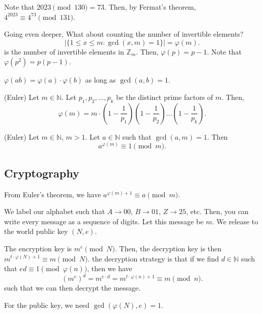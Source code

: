 \documentclass[a4paper]{article}
\begin{document}
Note that \( 2023 \pmod {130} = 73 \). Then, by Fermat's theorem, \( 4^{2023} \equiv 4^{73} \pmod {131}   \).

Going even deeper, What about counting the number of invertible elements?
\[
	\left| \{1 \le  x \le m \colon \gcd(x,m)=1\}   \right| = \varphi(m)
.\] is the number of invertible elements in \( \mathbb{Z}_m \). Then, \( \varphi(p)=p-1 \). Note that \( \varphi(p^2)=p(p-1) \).

\begin{theorem}
	\( \varphi(ab)=\varphi(a) \cdot  \varphi(b) \) as long as \( \gcd(a,b)=1 \).
\end{theorem}

\begin{theorem}
	(Euler) Let \( m \in \mathbb{N} \). Let \( p_{1},p_{2},\ldots ,p_k \) be the distinct prime factors of \( m \). Then, \[
		\varphi(m) = m \cdot \left( 1-\frac{1}{p_{1}} \right) \left( 1- \frac{1}{p_{2}} \right)\ldots  \left( 1-\frac{1}{p_k} \right) 
	.\] 
\end{theorem}

\begin{theorem}
	(Euler) Let \( m \in \mathbb{N} \), \( m > 1 \). Let \( a \in \mathbb{N} \) such that \( \gcd(a,m)=1 \). Then \[
		a^{\varphi(m)} \equiv 1 \pmod m
	.\] 
\end{theorem}

\subsection{Cryptography}

From Euler's theorem, we have \( a^{\varphi(m)+1}\equiv a \pmod m  \).

We label our alphabet such that \( A \to 00 \), \( B \to 01 \), \( Z \to  25 \), etc. Then, you can write every message as a sequence of digits. Let this message be \( m \). We release to the world public key \( (N,e) \).

The encryption key is \( m^e \pmod N \). Then, the decryption key is then \( m^{t\cdot \varphi(N)+1}\equiv m \pmod N  \). the decryption strategy is that if we find \( d \in \mathbb{N} \) such that \( ed \equiv 1 \pmod {\varphi(n)} \), then we have \[
	\left( m^e \right) ^d = m^{e\cdot d} = m^{t\cdot \varphi(n)+1} \equiv m \pmod n
.\] such that we can then decrypt the message.

\begin{note}
	For the public key, we need \( \gcd(\varphi(N), e)=1 \).
\end{note}
\end{document}
